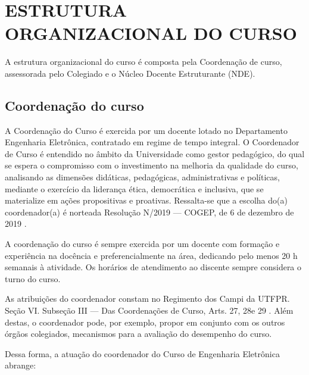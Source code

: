\chapter{ESTRUTURA ORGANIZACIONAL DO CURSO}

A estrutura organizacional do curso é composta pela Coordenação de curso, assessorada pelo Colegiado e o Núcleo Docente Estruturante (NDE).

\section{Coordenação do curso}

A Coordenação do Curso é exercida por um docente lotado no Departamento Engenharia Eletrônica, contratado em regime de tempo integral. O Coordenador de Curso é entendido no âmbito da Universidade como gestor pedagógico, do qual se espera o compromisso com o investimento na melhoria da qualidade do curso, analisando as dimensões didáticas, pedagógicas, administrativas e políticas, mediante o exercício da liderança ética, democrática e inclusiva, que se materialize em ações propositivas e proativas. Ressalta-se que a escolha do(a) coordenador(a) é norteada Resolução N/2019 — COGEP, de 6 de dezembro de 2019 \cite{cogep145}.

A coordenação do curso é sempre exercida por um docente com formação e experiência na docência e preferencialmente na área, dedicando pelo menos 20 h semanais à atividade. Os horários de atendimento ao discente sempre considera o turno do curso.

As atribuições do coordenador constam no Regimento dos Campi da UTFPR. Seção VI. Subseção III — Das Coordenações de Curso, Arts. 27\textordmasculine, 28\textordmasculine e 29\textordmasculine{} \cite{regimento}. Além destas, o coordenador pode, por exemplo, propor em conjunto com os outros órgãos colegiados, mecanismos para a avaliação do desempenho do curso.

Dessa forma, a atuação do coordenador do Curso de Engenharia Eletrônica abrange:


